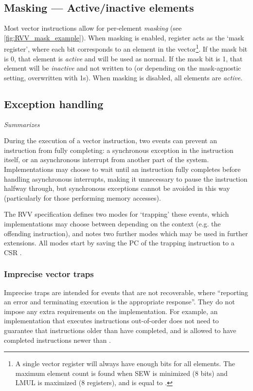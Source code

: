 \subsection{Masking --- Active/inactive elements}\label{chap:bg:subsec:rvvmasking}
Most vector instructions allow for per-element \emph{masking} (see \cref{fig:RVV_mask_example}).
When masking is enabled, register  acts as the `mask register', where each bit corresponds to an element in the vector\footnote{A single vector register will always have enough bits for all elements. The maximum element count is found when SEW is minimized (8 bits) and LMUL is maximized (8 registers), and is equal to .}.
If the mask bit is 0, that element is \emph{active} and will be used as normal.
If the mask bit is 1, that element will be \emph{inactive} and not written to (or depending on the mask-agnostic setting, overwritten with 1s).
When masking is disabled, all elements are \emph{active}.

\pagebreak
\subsection{Exception handling}\label{chap:bg:subsec:vexceptions}
\emph{Summarizes \cite[Section 17]{RISCVVectorExtension2021}}

During the execution of a vector instruction, two events can prevent an instruction from fully completing: a synchronous exception in the instruction itself, or an asynchronous interrupt from another part of the system.
Implementations may choose to wait until an instruction fully completes before handling asynchronous interrupts, making it unnecessary to pause the instruction halfway through, but synchronous exceptions cannot be avoided in this way (particularly for those performing memory accesses).

The RVV specification defines two modes for `trapping' these events, which implementations may choose between depending on the context (e.g. the offending instruction), and notes two further modes which may be used in further extensions.
All modes start by saving the PC of the trapping instruction to a CSR .

\subsubsection{Imprecise vector traps}
Imprecise traps are intended for events that are not recoverable, where \enquote{reporting an error and terminating execution is the appropriate response}.
They do not impose any extra requirements on the implementation.
For example, an implementation that executes instructions out-of-order does not need to guarantee that instructions older than  have completed, and is allowed to have completed instructions newer than .

